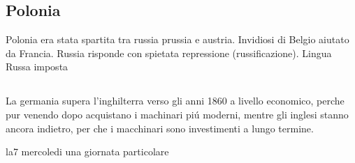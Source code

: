 \documentclass{article}
\begin{document}
\subsection{Polonia}
Polonia era stata spartita tra russia prussia e austria. Invidiosi di Belgio aiutato da Francia. Russia risponde con spietata repressione (russificazione). Lingua Russa imposta
\subsection{}
La germania supera l'inghilterra verso gli anni 1860 a livello economico, perche pur venendo dopo acquistano i machinari piú moderni, mentre gli inglesi stanno ancora indietro, per che i macchinari sono investimenti a lungo termine.
\pagebreak

la7 mercoledi una giornata particolare
\end{document}
